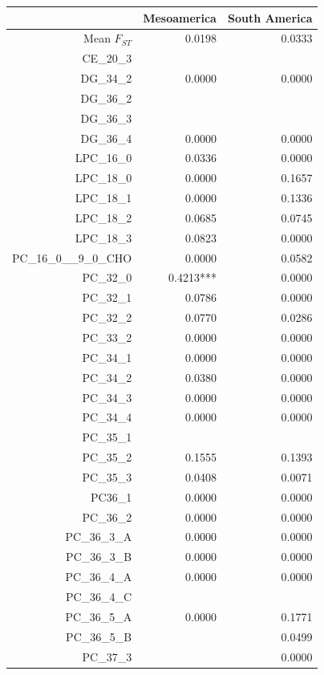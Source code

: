 \documentclass[9pt,twocolumn,twoside,lineno]{gsajnl}
\begin{document}
\begin{table}[ht]
\centering
\tiny
\begin{tabular}{rrr}
  \hline
 & Mesoamerica & South America \\ 
  \hline
Mean $F_{ST}$ & 0.0198 & 0.0333 \\
CE\_20\_3 &  &  \\ 
  DG\_34\_2 & 0.0000 & 0.0000 \\ 
  DG\_36\_2 &  &  \\ 
  DG\_36\_3 &  &  \\ 
  DG\_36\_4 & 0.0000 & 0.0000 \\ 
  LPC\_16\_0 & 0.0336 & 0.0000 \\ 
  LPC\_18\_0 & 0.0000 & 0.1657 \\ 
  LPC\_18\_1 & 0.0000 & 0.1336 \\ 
  LPC\_18\_2 & 0.0685 & 0.0745 \\ 
  LPC\_18\_3 & 0.0823 & 0.0000 \\ 
  PC\_16\_0\_\_9\_0\_CHO & 0.0000 & 0.0582 \\ 
  PC\_32\_0 & 0.4213*** & 0.0000 \\ 
  PC\_32\_1 & 0.0786 & 0.0000 \\ 
  PC\_32\_2 & 0.0770 & 0.0286 \\ 
  PC\_33\_2 & 0.0000 & 0.0000 \\ 
  PC\_34\_1 & 0.0000 & 0.0000 \\ 
  PC\_34\_2 & 0.0380 & 0.0000 \\ 
  PC\_34\_3 & 0.0000 & 0.0000 \\ 
  PC\_34\_4 & 0.0000 & 0.0000 \\ 
  PC\_35\_1 &  &  \\ 
  PC\_35\_2 & 0.1555 & 0.1393 \\ 
  PC\_35\_3 & 0.0408 & 0.0071 \\ 
  PC36\_1 & 0.0000 & 0.0000 \\ 
  PC\_36\_2 & 0.0000 & 0.0000 \\ 
  PC\_36\_3\_A & 0.0000 & 0.0000 \\ 
  PC\_36\_3\_B & 0.0000 & 0.0000 \\ 
  PC\_36\_4\_A & 0.0000 & 0.0000 \\ 
  PC\_36\_4\_C &  &  \\ 
  PC\_36\_5\_A & 0.0000 & 0.1771 \\ 
  PC\_36\_5\_B &  & 0.0499 \\ 
  PC\_37\_3 &  & 0.0000 \\ 

\end{tabular}
\end{table}
\end{document}
